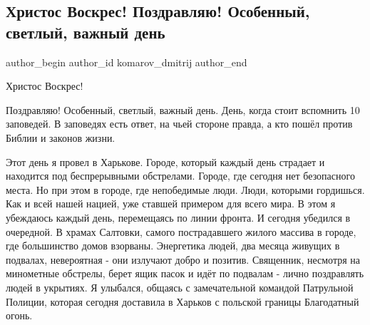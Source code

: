  
 
 
 
 
 
\subsection{Христос Воскрес! Поздравляю! Особенный, светлый, важный день}
\label{sec:24_04_2022.fb.komarov_dmitrij.1.hristos_voskres}
 
\ifcmt
 author_begin
   author_id komarov_dmitrij
 author_end
\fi

Христос Воскрес!

Поздравляю! Особенный, светлый, важный день. День, когда стоит вспомнить 10
заповедей. В заповедях есть ответ, на чьей стороне правда, а кто пошёл против
Библии и законов жизни.


Этот день я провел в Харькове. Городе, который каждый день страдает и находится
под беспрерывными обстрелами. Городе, где сегодня нет безопасного места. Но при
этом в городе, где непобедимые люди. Люди, которыми гордишься. Как и всей нашей
нацией, уже ставшей примером для всего мира. В этом я убеждаюсь каждый день,
перемещаясь по линии фронта. И сегодня убедился в очередной. В храмах Салтовки,
самого пострадавшего жилого массива в городе, где большинство домов взорваны.
Энергетика людей, два месяца живущих в подвалах, невероятная - они излучают
добро и позитив.  Священник, несмотря на минометные обстрелы, берет ящик пасок
и идёт по подвалам - лично поздравлять людей в укрытиях. Я улыбался, общаясь с
замечательной командой Патрульной Полиции, которая сегодня доставила в Харьков
с польской границы Благодатный огонь.

